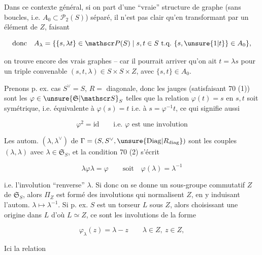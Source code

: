 
Dans ce contexte général, si on part d'une ``vraie'' structure de graphe (sans boucles, i.e. $A_0\subset\mathscr P_2(S)$) séparé, il n'est pas clair qu'en  transformant par un élément de $Z$, faisant

\[
\text{donc}\quad A_\lambda=\{\{s,\lambda t\}\in\mathscr P(S)\mid s,t\in S\ \text{t.q.}\ \{s,\unsure{1|t}\}\in A_0\},
\]

on trouve encore des vrais graphes -- car il pourrait arriver qu'on ait $t=\lambda s$ pour un \deleted{$\lambda$} triple convenable $(s,t,\lambda)\in S\times S\times Z$, avec $\{s,t\}\in A_0$.

Prenons p. ex. cas $S^\vee=S$, $R={}$ diagonale, donc les jauges (satisfaisant 70 (1)) sont les $\varphi\in\unsure{\mathfrak S|\mathscr S}_S$ telles que la relation  $\varphi(t)=s$ en $s,t$ soit symétrique, i.e. équivalente à $\varphi(s)=t$ i.e. à $s=\varphi^{-1}t$, ce qui signifie aussi

\[
\varphi^2=\mathrm{id}\qquad\text{i.e. }\varphi\text{ est une involution} \tag*{(71)}
\]

Les autom.  $(\lambda,\lambda^\vee)$ de $\Gamma=(S,S^\vee,\unsure{\mathrm{Diag}|R_{\mathrm{diag}}})$ sont les couples $(\lambda,\lambda)$ avec $\lambda\in\mathfrak S_S$, et la condition 70 (2) s'écrit

\[
\lambda\varphi\lambda=\varphi\qquad\text{soit}\quad\varphi(\lambda)=\lambda^{-1} \tag*{(72)}
\]

i.e. l'involution ``renverse'' $\lambda$. Si donc on se donne un sous-groupe commutatif $Z$ de $\mathfrak S_S$, alors $\Pi_Z$ est formé des involutions  qui  normalisent $Z$, en y induisant l'autom.  $\lambda\longmapsto\lambda^{-1}$. Si p. ex. $S$ est  un torseur $L$ sous $Z$,    alors choisissant une origine dans $L$ d'où $L\simeq Z$, ce sont les involutions de la forme

\[
\varphi_\lambda(z)=\lambda-z\qquad \lambda\in Z,\ z\in Z,
\]

Ici la relation 

